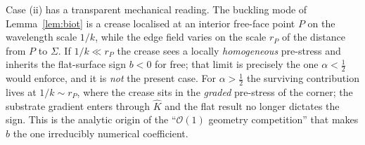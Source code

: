 \begin{remark}
    \label{rem:twoscales}
    Case (ii) has a transparent mechanical reading. The buckling mode of Lemma~\ref{lem:biot} is a crease localised at
    an interior free-face point $P$ on the wavelength scale $1/k$, while the edge field varies on the scale $r_P$ of the
    distance from $P$ to $\Sigma$. If $1/k\ll r_P$ the crease sees a locally \emph{homogeneous} pre-stress and inherits
    the flat-surface sign $b<0$ for free; that limit is precisely the one $\alpha<\tfrac12$ would enforce, and it is
    \emph{not} the present case. For $\alpha>\tfrac12$ the surviving contribution lives at $1/k\sim r_P$, where the crease
    sits in the \emph{graded} pre-stress of the corner; the substrate gradient enters through $\hat K$ and the flat
    result no longer dictates the sign. This is the analytic origin of the ``$\mathcal{O}(1)$ geometry competition'' that
    makes $b$ the one irreducibly numerical coefficient.
\end{remark}

